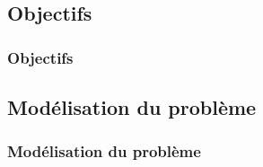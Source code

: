 \subsection{Objectifs}
\begin{frame}
	\frametitle{Objectifs}
\end{frame}

\subsection{Modélisation du problème}
\begin{frame}
	\frametitle{Modélisation du problème}
	\begin{center}
		
	\end{center}
\end{frame}

